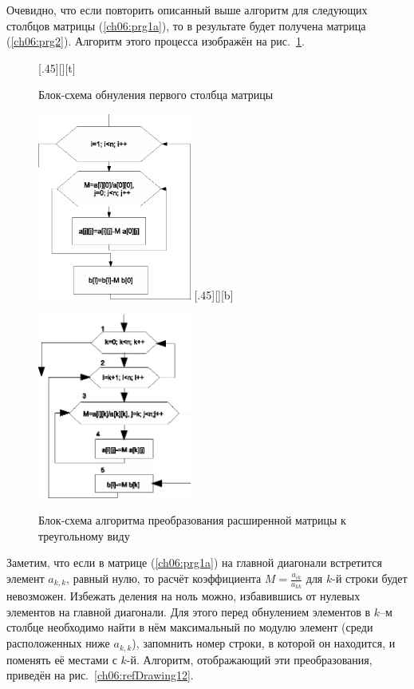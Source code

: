 Очевидно, что если повторить описанный выше алгоритм для следующих столбцов матрицы (\ref{ch06:prg1a}), 
то в результате будет получена
матрица (\ref{ch06:prg2}). Алгоритм этого процесса изображён на рис.~\ref{ch06:refDrawing11}.
{\small
\begin{figure}[h]
\begin{floatrow}
[.45\textwidth][\FBheight][t]
{\caption{Блок-схема обнуления первого столбца матрицы}
\label{ch06:refDrawing10}}
{\includegraphics[width=0.45\textwidth,keepaspectratio]{img/ris_6_11}}\hspace*{0.05\textwidth}
%
[.45\textwidth][\FBheight][b]
{\caption{Блок-схема алгоритма преобразования расширенной матрицы к треугольному виду}
\label{ch06:refDrawing11}}
{\includegraphics[width=0.45\textwidth,keepaspectratio]{img/ris_6_12}}
\end{floatrow}
\end{figure}
}

Заметим, что если в матрице (\ref{ch06:prg1a}) на главной диагонали встретится элемент  $a_{k,k}$, равный нулю, то
расчёт коэффициента $M=\frac{a_{ik}}{a_{kk}}$  для $k$-й строки будет невозможен. Избежать деления на
ноль можно, избавившись от нулевых элементов на главной диагонали. Для этого перед обнулением элементов в $k$–м столбце
необходимо найти в нём максимальный по модулю элемент (среди расположенных ниже  $a_{k,k}$), запомнить номер строки, в
которой он находится, и поменять её местами с $k$-й. Алгоритм, отображающий эти преобразования, приведён 
на рис.~\ref{ch06:refDrawing12}.

